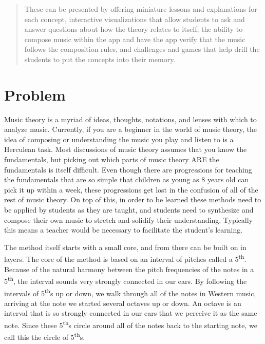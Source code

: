 \documentclass[onecolumn, draftclsnofoot,10pt, compsoc]{IEEEtran}
\begin{document}
\begin{titlepage}
\begin{singlespace}
\begin{abstract}
          These can be presented by offering miniature lessons and explanations for each concept, interactive visualizations that allow students to ask and answer questions about how the theory relates to itself, the ability to compose music within the app and have the app verify that the music follows the composition rules, and challenges and games that help drill the students to put the concepts into their memory.

        \end{abstract}     
    \end{singlespace}
\end{titlepage}
\newpage
{}
\tableofcontents
\clearpage

\section{Problem}
Music theory is a myriad of ideas, thoughts, notations, and lenses with which to analyze music. 
Currently, if you are a beginner in the world of music theory, the idea of composing or understanding the music you play and listen to is a Herculean task. 
Most discussions of music theory assumes that you know the fundamentals, but picking out which parts of music theory ARE the fundamentals is itself difficult. 
Even though there are progressions for teaching the fundamentals that are so simple that children as young as 8 years old can pick it up within a week, these progressions get lost in the confusion of all of the rest of music theory. 
On top of this, in order to be learned these methods need to be applied by students as they are taught, and students need to synthesize and compose their own music to stretch and solidify their understanding. 
Typically this means a teacher would be necessary to facilitate the student's learning.

\par
The method itself starts with a small core, and from there can be built on in layers. 
The core of the method is based on an interval of pitches called a 5\textsuperscript{th}. Because of the natural harmony between the pitch frequencies of the notes in a 5\textsuperscript{th}, the interval sounds very strongly connected in our ears. 
By following the intervals of 5\textsuperscript{th}s up or down, we walk through all of the notes in Western music, arriving at the note we started several octaves up or down. 
An octave is an interval that is so strongly connected in our ears that we perceive it as the same note. 
Since these 5\textsuperscript{th}s circle around all of the notes back to the starting note, we call this the circle of 5\textsuperscript{th}s. 
\end{document}
